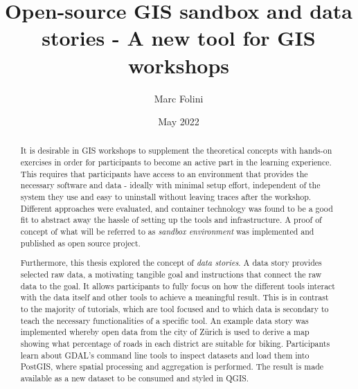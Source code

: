 \documentclass[11pt, a4paper, oneside, parskip=full-]{scrartcl}
\title{Open-source GIS sandbox and data stories - A new tool for GIS workshops}
\author{Marc Folini}
\date{May 2022}
\begin{document}
\begin{titlepage}
  \setcounter{page}{1}
  \clearpage\maketitle
  \thispagestyle{empty}
  \begin{abstract}
    It is desirable in GIS workshops to supplement the theoretical concepts with
    hands-on exercises in order for participants to become an active part in the
    learning experience. This requires that participants have access to an
    environment that provides the necessary software and data - ideally with
    minimal setup effort, independent of the system they use and easy to
    uninstall without leaving traces after the workshop. Different approaches
    were evaluated, and container technology was found to be a good fit to
    abstract away the hassle of setting up the tools and infrastructure. A proof
    of concept of what will be referred to as \emph{sandbox environment} was
    implemented and published as open source project.

    Furthermore, this thesis explored the concept of \emph{data stories}. A data
    story provides selected raw data, a motivating tangible goal and
    instructions that connect the raw data to the goal. It allows participants
    to fully focus on how the different tools interact with the data itself and
    other tools to achieve a meaningful result. This is in contrast to the
    majority of tutorials, which are tool focused and to which data is secondary
    to teach the necessary functionalities of a specific tool. An example data
    story was implemented whereby open data from the city of Zürich is used to
    derive a map showing what percentage of roads in each district are suitable
    for biking. Participants learn about GDAL's command line tools to inspect
    datasets and load them into PostGIS, where spatial processing and
    aggregation is performed. The result is made available as a new dataset to
    be consumed and styled in QGIS.
  \end{abstract}
\end{titlepage}

\newpage
\tableofcontents

\newpage
{}
\setcounter{page}{1}
\end{document}
